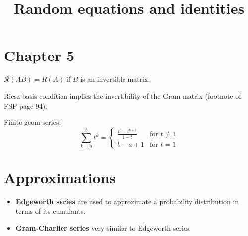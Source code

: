 \documentclass{article}
\begin{document}
\title{\bf Random equations and identities}
\maketitle
\section*{Chapter 5}

$\mathcal{R}(AB) = R(A)$ if $B$ is an invertible matrix.

Riesz basis condition  implies the invertibility of the Gram matrix (footnote of FSP page 94).

Finite geom series: 
\begin{equation}
\sum\limits_{k=a}^{b}t^k=\begin{cases} \frac{t^a-t^{b+1}}{1-t} & \text{for } t\neq 1 \\ b-a+1 &
 \text{for } t=1
 \end{cases}
\end{equation}

\section*{Approximations}

\begin{itemize}
\item \textbf{Edgeworth series} are used to approximate a probability distribution in terms of its cumulants.
\item \textbf{Gram-Charlier series} very similar to Edgeworth series. 
\end{itemize}



\end{document}
